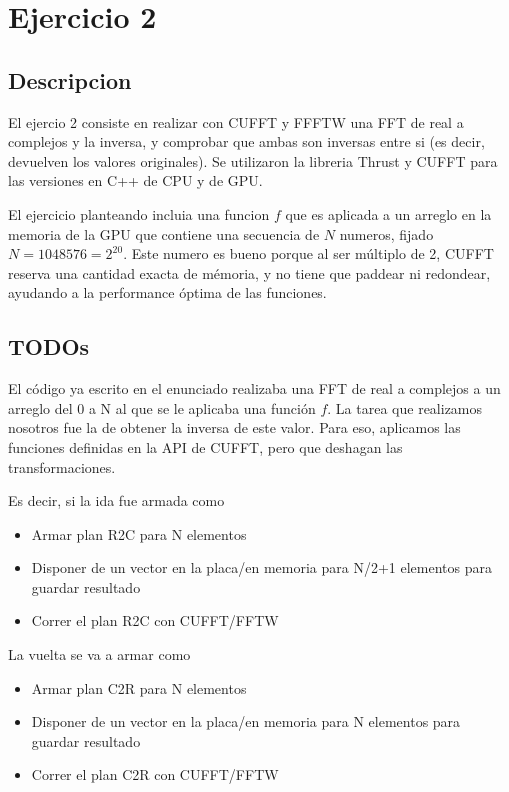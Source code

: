 \section{Ejercicio 2}
\subsection{Descripcion}
El ejercio 2 consiste en realizar con CUFFT y FFFTW una FFT de real a complejos y la inversa,
y comprobar que ambas son inversas entre si (es decir, devuelven los valores originales).
Se utilizaron la libreria Thrust y CUFFT para las versiones en C++ de CPU y de GPU.

El ejercicio planteando incluia una funcion $f$ que es aplicada a un arreglo en la memoria de la GPU que contiene
una secuencia de $N$ numeros, fijado $N=1048576=2^{20}$. Este numero es bueno porque al ser m\'ultiplo de 2,
CUFFT reserva una cantidad exacta de m\'emoria, y no tiene que paddear ni redondear, ayudando a la performance 
\'optima de las funciones.

\subsection{TODOs}

El c\'odigo ya escrito en el enunciado realizaba una FFT de real a complejos a un arreglo del 0 a N al que se
le aplicaba una funci\'on $f$. La tarea que realizamos nosotros fue la de obtener la inversa de este valor.
Para eso, aplicamos las funciones definidas en la API de CUFFT, pero que deshagan las transformaciones.

Es decir, si la ida fue armada como 
\begin{itemize}
    \item Armar plan R2C para N elementos
    \item Disponer de un vector en la placa/en memoria para N/2+1 elementos para guardar resultado
    \item Correr el plan R2C con CUFFT/FFTW
\end{itemize}

La vuelta se va a armar como

\begin{itemize}
    \item Armar plan C2R para N elementos
    \item Disponer de un vector en la placa/en memoria para N elementos para guardar resultado
    \item Correr el plan C2R con CUFFT/FFTW
\end{itemize}


